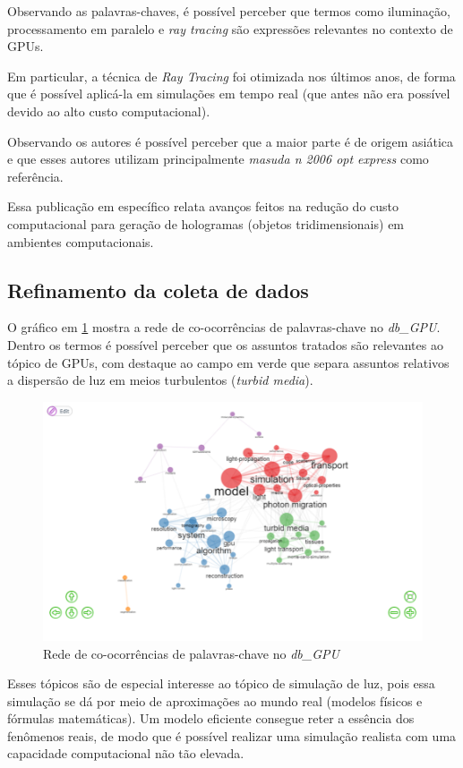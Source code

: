 Observando as palavras-chaves, é possível perceber que termos como iluminação, processamento em paralelo e \textit{ray tracing} são expressões relevantes no contexto de GPUs.

Em particular, a técnica de \textit{Ray Tracing} foi otimizada nos últimos anos, de forma que é possível aplicá-la em simulações em tempo real (que antes não era possível devido ao alto custo computacional).

Observando os autores é possível perceber que a maior parte é de origem asiática e que esses autores utilizam principalmente \textit{masuda n 2006 opt express} como referência.

Essa publicação em específico relata avanços feitos na redução do custo computacional para geração de hologramas (objetos tridimensionais) em ambientes computacionais.

\subsection{Refinamento da coleta de dados}

O gráfico em \ref{fig:gpu-co-occur} mostra a rede de co-ocorrências de palavras-chave no \textit{db\_GPU}. Dentro os termos é possível perceber que os assuntos tratados são relevantes ao tópico de GPUs, com destaque ao campo em verde que separa assuntos relativos a dispersão de luz em meios turbulentos (\textit{turbid media}).

\begin{figure}[ht]
    \includegraphics[width=12cm]{experiments/gustavo-tomas/AnaliseBibliometrica/GPUs/Graficos/gpu-co-ocurr.png}
    \caption{Rede de co-ocorrências de palavras-chave no \textit{db\_GPU}}
    \label{fig:gpu-co-occur}
\end{figure}

Esses tópicos são de especial interesse ao tópico de simulação de luz, pois essa simulação se dá por meio de aproximações ao mundo real (modelos físicos e fórmulas matemáticas). Um modelo eficiente consegue reter a essência dos fenômenos reais, de modo que é possível realizar uma simulação realista com uma capacidade computacional não tão elevada.

